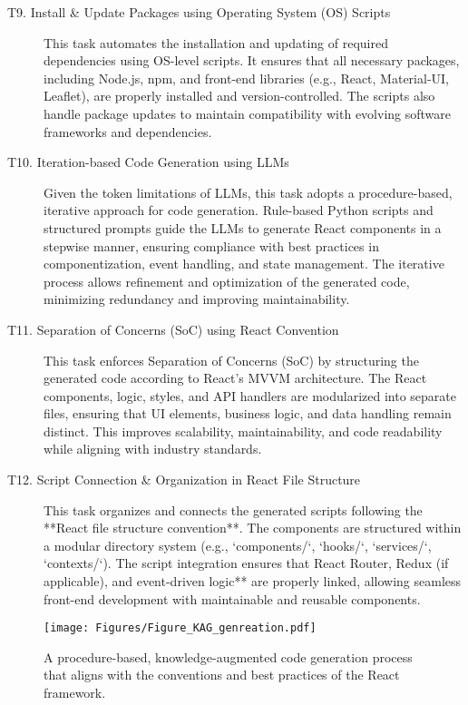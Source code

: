 \begin{description}
    \item[T9. Install \& Update Packages using Operating System (OS) Scripts]  
    This task automates the installation and updating of required dependencies using OS-level scripts. It ensures that all necessary packages, including Node.js, npm, and front-end libraries (e.g., React, Material-UI, Leaflet), are properly installed and version-controlled. The scripts also handle package updates to maintain compatibility with evolving software frameworks and dependencies.

    \item[T10. Iteration-based Code Generation using LLMs]  
    Given the token limitations of LLMs, this task adopts a procedure-based, iterative approach for code generation. Rule-based Python scripts and structured prompts guide the LLMs to generate React components in a stepwise manner, ensuring compliance with best practices in componentization, event handling, and state management. The iterative process allows refinement and optimization of the generated code, minimizing redundancy and improving maintainability.

    \item[T11. Separation of Concerns (SoC) using React Convention]  
    This task enforces Separation of Concerns (SoC) by structuring the generated code according to React’s MVVM architecture. The React components, logic, styles, and API handlers are modularized into separate files, ensuring that UI elements, business logic, and data handling remain distinct. This improves scalability, maintainability, and code readability while aligning with industry standards.

    \item[T12. Script Connection \& Organization in React File Structure]  
    This task organizes and connects the generated scripts following the **React file structure convention**. The components are structured within a modular directory system (e.g., `components/`, `hooks/`, `services/`, `contexts/`). The script integration ensures that React Router, Redux (if applicable), and event-driven logic** are properly linked, allowing seamless front-end development with maintainable and reusable components.
\end{description}

\begin{figure*}[htbp]
 \centering
\texttt{[image: Figures/Figure\_KAG\_genreation.pdf]}
 \caption{A procedure-based, knowledge-augmented code generation process that aligns with the conventions and best practices of the React framework. }
 \label{fig:kag}
\end{figure*}


